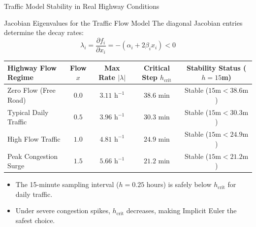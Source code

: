 \documentclass[aspectratio=169,10pt]{beamer}
\begin{document}
\begin{frame}{Traffic Model Stability in Real Highway Conditions}
  \begin{block}{Jacobian Eigenvalues for the Traffic Flow Model}
    The diagonal Jacobian entries determine the decay rates:
    \[
      \lambda_i = \frac{\partial f_i}{\partial x_i} = -(\alpha_i + 2\beta_i x_i) < 0
    \]
  \end{block}

  \begin{table}[h]
    \centering
    \footnotesize
    \setlength{\tabcolsep}{3.5pt}
    \begin{tabular}{lcccc}
      \toprule
      \textbf{Highway Flow Regime} & \textbf{Flow $x$} & \textbf{Max Rate $|\lambda|$} & \textbf{Critical Step $h_{\text{crit}}$} & \textbf{Stability Status ($h=15$m)} \\
      \midrule
      Zero Flow (Free Road)       & $0.0$ & $3.11\text{ h}^{-1}$ & $38.6\text{ min}$ & Stable ($15\text{m} < 38.6\text{m}$) \\
      Typical Daily Traffic       & $0.5$ & $3.96\text{ h}^{-1}$ & $30.3\text{ min}$ & Stable ($15\text{m} < 30.3\text{m}$) \\
      High Flow Traffic           & $1.0$ & $4.81\text{ h}^{-1}$ & $24.9\text{ min}$ & Stable ($15\text{m} < 24.9\text{m}$) \\
      Peak Congestion Surge       & $1.5$ & $5.66\text{ h}^{-1}$ & $21.2\text{ min}$ & Stable ($15\text{m} < 21.2\text{m}$) \\
      \bottomrule
    \end{tabular}
  \end{table}

  \begin{itemize}
    \item The 15-minute sampling interval ($h = 0.25$ hours) is safely below $h_{\text{crit}}$ for daily traffic.
    \item Under severe congestion spikes, $h_{\text{crit}}$ decreases, making Implicit Euler the safest choice.
  \end{itemize}
\end{frame}
\end{document}
